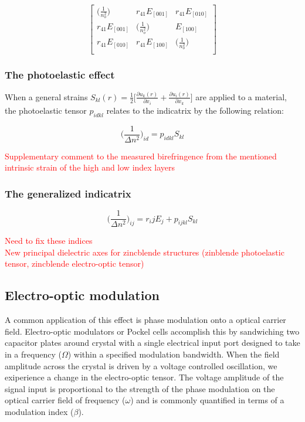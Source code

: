 \begin{equation}
 \left[ {\begin{array}{ccc}
   \big( \frac{1}{n_o ^2} \big)& r_{41}E_{[001]} & r_{41} E_{[010]}\\
   r_{41}E_{[001]} & \big( \frac{1}{n_o ^2} \big) &  E_{[100]}\\
   r_{41} E_{[010]} & r_{41} E_{[100]} & \big( \frac{1}{n_o ^2} \big)\\
  \end{array}} \right]
\end{equation}

\subsubsection{The photoelastic effect}

When a general strains $S_{kl}(r) = \frac{1}{2} \bigg[ \frac{\partial u_k (r)}{\partial x_i} + \frac{\partial u_i (r)}{\partial x_k} \bigg]$ are applied to a material, the photoelastic tensor $p_{idkl}$ relates to the indicatrix by the following relation:

\begin{equation}
 \bigg( \frac{1}{\Delta n^2} \bigg)_{id} = p_{idkl} S_{kl}
\end{equation}

\textcolor{red}{Supplementary comment to the measured birefringence from the mentioned intrinsic strain of the high and low index layers}

\subsubsection{The generalized indicatrix}


\begin{equation}
\bigg( \frac{1}{\Delta n^2} \bigg)_{ij} = r_ijE_j + p_{ijkl} S_{kl}
\end{equation}

\textcolor{red}{Need to fix these indices}
\\
\textcolor{red}{New principal dielectric axes for zincblende structures (zinblende photoelastic tensor, zincblende electro-optic tensor)}

\subsection{Electro-optic modulation}\label{sec:EOM}
A common application of this effect is phase modulation onto a optical carrier field. Electro-optic modulators or Pockel cells accomplish this by sandwiching two capacitor plates around crystal with a single electrical input port designed to take in a frequency ($\Omega$) within a specified modulation bandwidth. When the field amplitude across the crystal is driven by a voltage controlled oscillation, we exiperience a change in the electro-optic tensor. The voltage amplitude of the signal input is proportional to the strength of the phase modulation on the optical carrier field of frequency ($\omega$) and is commonly quantified in terms of a modulation index ($\beta$).

